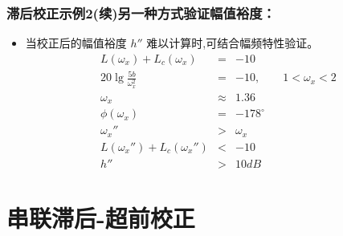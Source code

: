 \documentclass[table]{article}
\begin{document}
\begin{frame}
\frametitle{滞后校正示例2(续)另一种方式验证幅值裕度：}
\label{sec-3-2-6}

\begin{itemize}
\item 当校正后的幅值裕度  $h''$ 难以计算时,可结合幅频特性验证。
      \begin{eqnarray*}
      L(\omega_x)+L_c(\omega_x) &=& -10 \\
      20\lg\frac{5b}{\omega_x^2} &=& -10, \qquad 1<\omega_x<2 \\
      \omega_x &\approx& 1.36 \\
      \phi(\omega_x) & = & -178^{\circ} \\
      \omega_x'' &>& \omega_x \\
      L(\omega_x'')+L_c(\omega_x'') &<& -10 \\
      h'' &>& 10dB
      \end{eqnarray*}
\end{itemize}
\end{frame}
\section{串联滞后-超前校正}
\label{sec-4}
\end{document}
